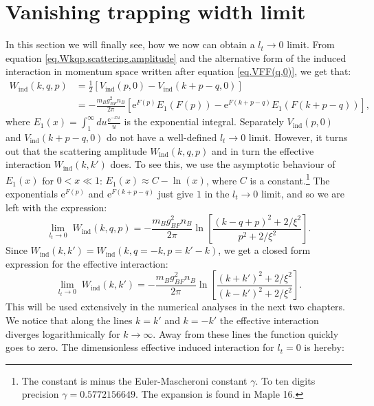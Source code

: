 \section{Vanishing trapping width limit} \label{sec.Vanishingtrappingwidtlimit}
In this section we will finally see, how we now can obtain a $l_t\to 0$ limit. From equation \eqref{eq.Wkqp.scattering.amplitude} and the alternative form of the induced interaction in momentum space written after equation \eqref{eq.VFF(q,0)}, we get that:
\begin{align}
W_{\text{ind}}(k, q, p) &= \frac{1}{2}\left[V_\text{ind}(p, 0) - V_\text{ind}(k + p - q,0)\right] \nonumber \\
&= -\frac{m_Bg_{BF}^2n_B}{2\pi}\left[ \text{e}^{F(p)} E_1(F(p)) - \text{e}^{F(k + p - q)} E_1(F(k + p - q)) \right], \nonumber
\end{align}
where $E_1(x) = \int_1^\infty du \frac{\text{e}^{-xu}}{u}$ is the exponential integral. Separately $V_\text{ind}(p,0)$ and $V_\text{ind}(k + p - q,0)$ do not have a well-defined $l_t \to 0$ limit. However, it turns out that the scattering amplitude $W_{\text{ind}}(k, q, p)$ and in turn the effective interaction $W_{\text{ind}}(k,k')$ does. To see this, we use the asymptotic behaviour of $E_1(x)$ for $0 < x \ll 1$: $E_1(x) \approx C -\ln(x)$, where $C$ is a constant.\footnote{The constant is minus the Euler-Mascheroni constant $\gamma$. To ten digits precision $\gamma = 0.5772156649$. The expansion is found in Maple 16.} The exponentials $\text{e}^{F(p)}$ and $\text{e}^{F(k + p - q)}$ just give $1$ in the $l_t \to 0$ limit, and so we are left with the expression:
\begin{equation}
\lim_{l_t \to 0} \; W_{\text{ind}}(k, q, p) = -\frac{m_Bg_{BF}^2n_B}{2\pi} \ln\left[\frac{(k - q + p)^2+2/\xi^2}{p^2+2/\xi^2}\right].
\label{eq.Wkqp.scattering.amplitude.lt=0} 
\end{equation}
Since $W_{\text{ind}}(k, k') = W_{\text{ind}}(k, q = -k, p = k' - k) $, we get a closed form expression for the effective interaction:
\begin{equation}
\lim_{l_t \to 0} \; W_{\text{ind}}(k, k') = -\frac{m_Bg_{BF}^2n_B}{2\pi} \ln\left[\frac{(k + k')^2+2/\xi^2}{(k - k')^2+2/\xi^2}\right].
\label{eq.EffectiveInteractionlt=0} 
\end{equation}
This will be used extensively in the numerical analyses in the next two chapters. We notice that along the lines $k = k'$ and $k = -k'$ the effective interaction diverges logarithmically for $k\to \infty$. Away from these lines the function quickly goes to zero. The dimensionless effective induced interaction for $l_t = 0$ is hereby:
